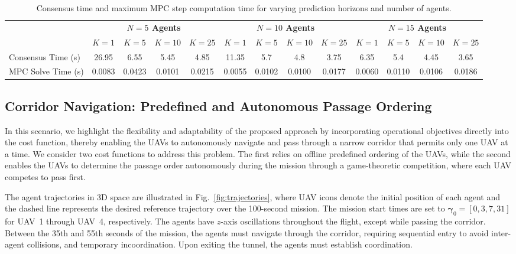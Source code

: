 \documentclass[letterpaper,journal]{IEEEtran}
\begin{document}
\begin{table}[!t]
\centering
\caption{Consensus time and maximum MPC step computation time for varying prediction horizons and number of agents.}
\label{tab:mpc_comparison}
\setlength{\aboverulesep}{0pt}
\setlength{\belowrulesep}{0pt} 
\begin{tabular}{lcccccccccccc}\toprule
\rowcolor{gray!20}
& \multicolumn{4}{c}{\textbf{$N=5$ Agents}} 
& \multicolumn{4}{c}{\textbf{$N=10$ Agents}} 
& \multicolumn{4}{c}{\textbf{$N=15$ Agents}} \\
\cmidrule(lr){2-5} \cmidrule(lr){6-9} \cmidrule(lr){10-13}
\rowcolor{gray!10}
\textbf{} 
  & \textbf{$K=1$} & \textbf{$K=5$} & \textbf{$K=10$} & \textbf{$K=25$} 
  & \textbf{$K=1$} & \textbf{$K=5$} & \textbf{$K=10$} & \textbf{$K=25$} 
  & \textbf{$K=1$} & \textbf{$K=5$} & \textbf{$K=10$} & \textbf{$K=25$} \\
\midrule
\noalign{\vspace{3pt}}
Consensus Time (s)      & 26.95 & 6.55 & 5.45 & 4.85 & 11.35 & 5.7 & 4.8 & 3.75 & 6.35 & 5.4 & 4.45 & 3.65 \\
\rowcolor{gray!5}
MPC Solve Time (s) & 0.0083 & 0.0423 & 0.0101 & 0.0215 & 0.0055 & 0.0102 & 0.0100 & 0.0177 & 0.0060 & 0.0110 & 0.0106 & 0.0186 \\
\bottomrule
\end{tabular}
\end{table}

\subsection{Corridor Navigation: Predefined and Autonomous Passage Ordering}\label{sec:seqvsgame}
In this scenario, we highlight the flexibility and adaptability of the proposed approach by incorporating operational objectives directly into the cost function, thereby enabling the UAVs to autonomously navigate and pass through a narrow corridor that permits only one UAV at a time.
We consider two cost functions to address this problem.
The first relies on offline predefined ordering of the UAVs, while the second enables the UAVs 
to determine the passage order autonomously during the mission through a game-theoretic competition, where each UAV competes to pass first.

The agent trajectories in 3D space are illustrated in Fig.~\ref{fig:trajectories}, where UAV icons 
denote the initial position of each agent and the dashed line represents the desired 
reference trajectory over the 100-second mission. The mission start times are set to $\bm\gamma_0 = [0, 3, 7, 31]$ for UAV~1 through UAV~4, respectively. The agents have $z$-axis 
oscillations throughout the flight, except while passing the corridor. Between the 35th and 55th seconds of the mission, the agents must navigate through the corridor, requiring sequential entry to avoid inter-agent collisions,
and temporary incoordination. Upon exiting the tunnel, the agents must establish coordination.
\end{document}

